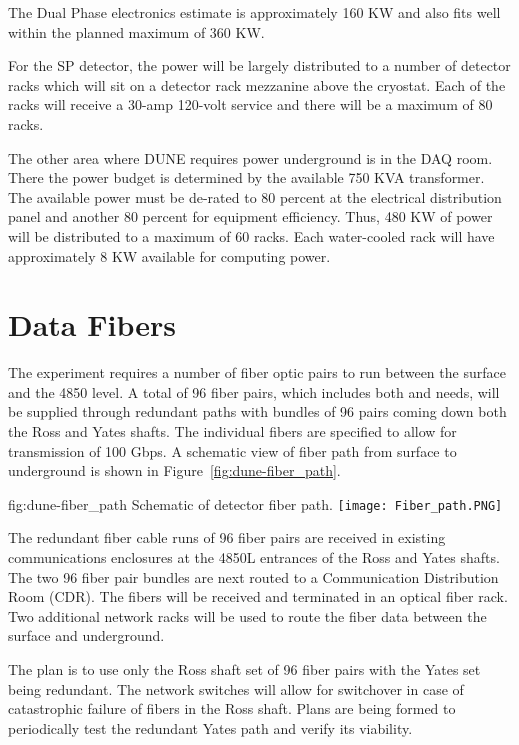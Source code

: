 The Dual Phase electronics estimate is approximately 160 KW and also fits well within the planned maximum of 360 KW.

For the SP detector, the power will be largely distributed to a number of detector racks which will sit on a detector rack mezzanine above the cryostat.  Each of the racks will receive a 30-amp 120-volt service and there will be a maximum of 80 racks.  

The other area where DUNE requires power underground is in the DAQ room.  There the power budget is determined by the available 750 KVA transformer.  The available power must be de-rated to 80 percent at the electrical distribution panel and another 80 percent for equipment efficiency.  Thus, 480 KW of power will be distributed to a maximum of 60 racks.  Each water-cooled rack will have approximately 8 KW available for computing power.  


\section{Data Fibers}
\label{sec:fdsp-coord-faci-fibers}


The  experiment requires a number of fiber 
optic pairs to run between the surface and the 4850 level.  A
total of 96 fiber pairs, which includes both  and  needs, will be supplied through redundant paths with bundles of 96 pairs coming down both the Ross and Yates shafts.  The individual fibers are specified to allow for transmission of 100 Gbps.  A schematic view of fiber path from surface to underground is shown in Figure~\ref{fig:dune-fiber_path}.  

\begin{dunefigure}{fig:dune-fiber_path}
  {Schematic of detector fiber path.}
  \texttt{[image: Fiber\_path.PNG]}
\end{dunefigure}

The redundant fiber cable runs of 96 fiber pairs are received in existing communications enclosures at the 4850L entrances of the Ross and Yates shafts.  The two 96 fiber pair bundles are next routed to a Communication Distribution Room (CDR).  The fibers will be received and terminated in an optical fiber rack. Two additional network racks will be used to route the fiber data between the surface and underground.

The plan is to use only the Ross shaft set of 96 fiber pairs with the Yates set being redundant.  The network switches will allow for switchover in case of catastrophic failure of fibers in the Ross shaft.  Plans are being formed to periodically test the redundant Yates path and verify its viability.

